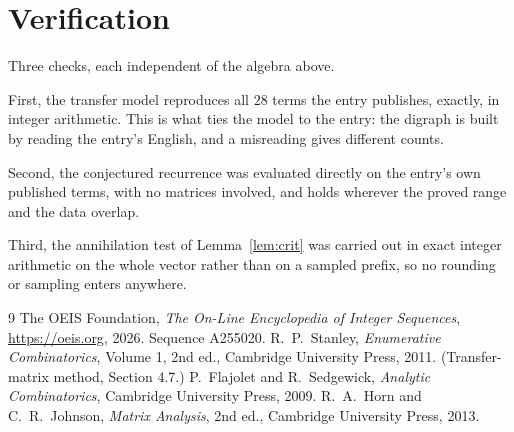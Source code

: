 \documentclass[11pt,a4paper]{article}
\theoremstyle{plain}
\theoremstyle{definition}
\begin{document}
\section{Verification}

Three checks, each independent of the algebra above.

First, the transfer model reproduces all $28$ terms the entry publishes, exactly, in
integer arithmetic. This is what ties the model to the entry: the digraph is built by reading
the entry's English, and a misreading gives different counts.

Second, the conjectured recurrence was evaluated directly on the entry's own published terms,
with no matrices involved, and holds wherever the proved range and the data overlap.

Third, the annihilation test of Lemma~\ref{lem:crit} was carried out in exact integer
arithmetic on the whole vector rather than on a sampled prefix, so no rounding or sampling
enters anywhere.

\begin{thebibliography}{9}
 The OEIS Foundation, \emph{The On-Line Encyclopedia of Integer
Sequences}, \url{https://oeis.org}, 2026. Sequence A255020.
 R.~P.~Stanley, \emph{Enumerative Combinatorics}, Volume 1, 2nd ed.,
Cambridge University Press, 2011. (Transfer-matrix method, Section 4.7.)
 P.~Flajolet and R.~Sedgewick, \emph{Analytic Combinatorics}, Cambridge
University Press, 2009.
 R.~A.~Horn and C.~R.~Johnson, \emph{Matrix Analysis}, 2nd ed., Cambridge
University Press, 2013.
\end{thebibliography}
\end{document}
